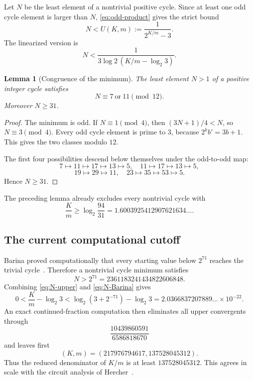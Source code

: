 \documentclass[11pt]{amsart}
\numberwithin{equation}{section}
\newtheorem{lemma}[theorem]{Lemma}
\begin{document}
Let $N$ be the least element of a nontrivial positive cycle.  Since at least one odd cycle element is larger than $N$, \eqref{eq:odd-product} gives the strict bound
\begin{equation}\label{eq:N-upper}
N< U(K,m):=\frac1{2^{K/m}-3}.
\end{equation}
The linearized version is
\[
N<\frac1{3\log 2\,(K/m-\log_2 3)}.
\]

\begin{lemma}[Congruence of the minimum]\label{lem:min-congruence}
The least element $N>1$ of a positive integer cycle satisfies
\[
N\equiv7\ \text{or}\ 11\pmod{12}.
\]
Moreover $N\ge31$.
\end{lemma}

\begin{proof}
The minimum is odd.  If $N\equiv1\pmod4$, then $(3N+1)/4<N$, so $N\equiv3\pmod4$.  Every odd cycle element is prime to $3$, because $2^k b'=3b+1$.  This gives the two classes modulo $12$.

The first four possibilities descend below themselves under the odd-to-odd map:
\[
7\mapsto11\mapsto17\mapsto13\mapsto5,
\quad
11\mapsto17\mapsto13\mapsto5,
\]
\[
19\mapsto29\mapsto11,
\quad
23\mapsto35\mapsto53\mapsto5.
\]
Hence $N\ge31$.
\end{proof}

The preceding lemma already excludes every nontrivial cycle with
\[
\frac Km\ge\log_2\frac{94}{31}
=1.6003925412907621634\ldots.
\]

\subsection{The current computational cutoff}

Barina proved computationally that every starting value below $2^{71}$ reaches the trivial cycle~\cite{Barina2025}.  Therefore a nontrivial cycle minimum satisfies
\begin{equation}\label{eq:N-Barina}
N>2^{71}=2361183241434822606848.
\end{equation}
Combining \eqref{eq:N-upper} and \eqref{eq:N-Barina} gives
\begin{equation}\label{eq:approx-cutoff}
0<\frac Km-\log_2 3
<\log_2(3+2^{-71})-\log_2 3
=2.0366837207889\ldots\times10^{-22}.
\end{equation}
An exact continued-fraction computation then eliminates all upper convergents through
\[
\frac{10439860591}{6586818670}
\]
and leaves first
\begin{equation}\label{eq:first-survivor}
(K,m)=
(217976794617,137528045312).
\end{equation}
Thus the reduced denominator of $K/m$ is at least $137528045312$.  This agrees in scale with the circuit analysis of Hercher~\cite{Hercher2023}.
\end{document}

